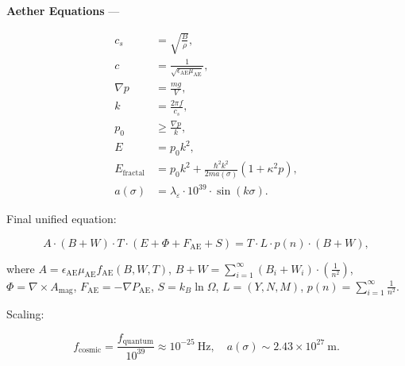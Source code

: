 \textbf{Aether Equations} ---

$$
\begin{aligned}
c_s &= \sqrt{\frac{B}{\rho}}, \\
c &= \frac{1}{\sqrt{\epsilon_{\mathrm{AE}} \mu_{\mathrm{AE}}}}, \\
\nabla p &= \frac{m g}{V}, \\
k &= \frac{2 \pi f}{c_s}, \\
p_0 &\geq \frac{\nabla p}{k}, \\
E &= p_0 k^2, \\
E_{\text{fractal}} &= p_0 k^2 + \frac{\hbar^2 k^2}{2 m a(\sigma)} \left( 1 + \kappa^2 p \right), \\
a(\sigma) &= \lambda_{\varepsilon} \cdot 10^{39} \cdot \sin (k \sigma).
\end{aligned}
$$

Final unified equation:

$$
A \cdot (B + W) \cdot T \cdot (E + \Phi + F_{\mathrm{AE}} + S) = T \cdot L \cdot p(n) \cdot (B + W),
$$

where $A = \epsilon_{\mathrm{AE}} \mu_{\mathrm{AE}} f_{\mathrm{AE}}(B, W, T)$, $B + W = \sum_{i=1}^{\infty} \left( B_i + W_i \right) \cdot \left( \frac{1}{n^2} \right)$, $\Phi = \nabla \times A_{\text{mag}}$, $F_{\mathrm{AE}} = -\nabla P_{\mathrm{AE}}$, $S = k_B \ln \Omega$, $L = (Y, N, M)$, $p(n) = \sum_{i=1}^{\infty} \frac{1}{n^2}$.

Scaling:

$$
f_{\text{cosmic}} = \frac{f_{\text{quantum}}}{10^{39}} \approx 10^{-25} \mathrm{~Hz}, \quad a(\sigma) \sim 2.43 \times 10^{27} \mathrm{~m}.
$$

